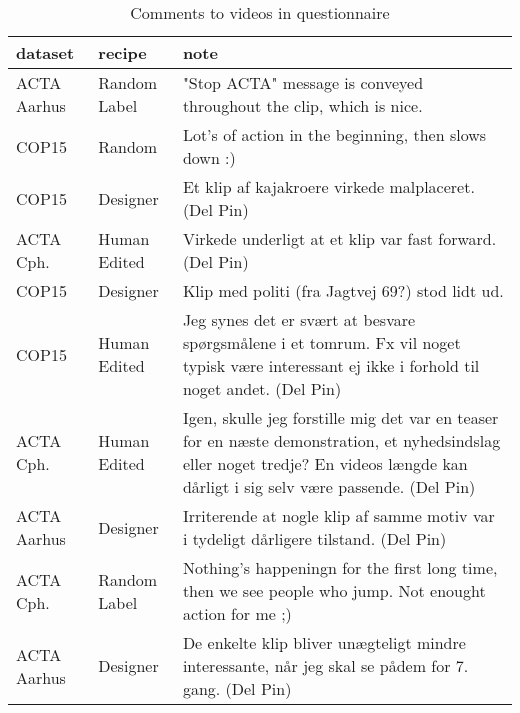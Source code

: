 \begin{table}[ht]
	\begin{center}
	\caption{Comments to videos in questionnaire}
	\label{tab:notes}
		\begin{tabular}{l l p{7.5cm}}
		\toprule
			dataset & recipe & note\\
			\midrule
			ACTA Aarhus & Random Label & "Stop ACTA" message is conveyed throughout the clip, which is nice.\\
			COP15 & Random & Lot's of action in the beginning, then slows down :)\\
			COP15 & Designer & Et klip af kajakroere virkede malplaceret. (Del Pin)\\
			ACTA Cph. & Human Edited & Virkede underligt at et klip var fast forward. (Del Pin)\\
			COP15 & Designer & Klip med politi (fra Jagtvej 69?) stod lidt ud.\\
			COP15 & Human Edited & Jeg synes det er sv\ae rt at besvare sp\o rgsm\aa lene i et tomrum. Fx vil noget typisk v\ae re interessant ej ikke i forhold til noget andet. (Del Pin)\\
			ACTA Cph. & Human Edited & Igen, skulle jeg forstille mig det var en teaser for en n\ae ste demonstration, et nyhedsindslag eller noget tredje? En videos l\ae ngde kan d\aa rligt i sig selv v\ae re passende. (Del Pin)\\
			ACTA Aarhus & Designer & Irriterende at nogle klip af samme motiv var i tydeligt d\aa rligere tilstand. (Del Pin)\\
			ACTA Cph. & Random Label & Nothing's happeningn for the first long time, then we see people who jump. Not enought action for me ;)\\
			ACTA Aarhus & Designer & De enkelte klip bliver un\ae gteligt mindre interessante, n\aa r jeg skal se p\aa  dem for 7. gang. (Del Pin)\\
		\bottomrule
		\end{tabular}
	\end{center}
\end{table}